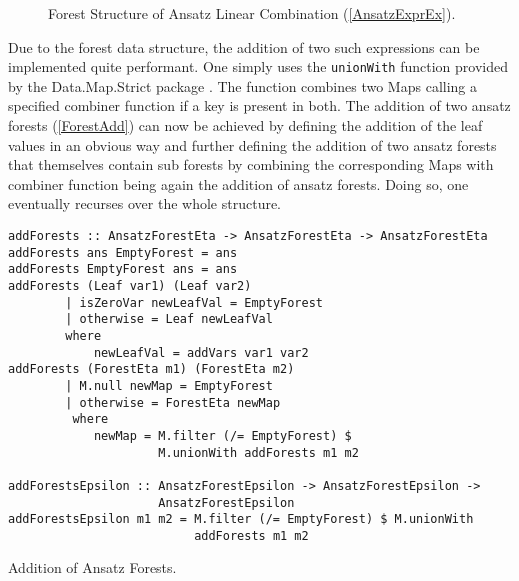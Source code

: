 \begin{figure}
\caption{Forest Structure of Ansatz Linear Combination (\ref{AnsatzExprEx}). }
\label{AnsatzExprExForest}
\end{figure}

Due to the forest data structure, the addition of two such expressions can be implemented quite performant. One simply uses the \texttt{unionWith} function provided by the Data.Map.Strict package \cite{HackageMap}. The function combines two Maps calling a specified combiner function if a key is present in both. The addition of two ansatz forests (\ref{ForestAdd}) can now be achieved by defining the addition of the leaf values in an obvious way and further defining the addition of two ansatz forests that themselves contain sub forests by combining the corresponding Maps with combiner function being again the addition of ansatz forests. Doing so, one eventually recurses over the whole structure. 
\begin{listing}[hbt!] 
\begin{verbatim}
addForests :: AnsatzForestEta -> AnsatzForestEta -> AnsatzForestEta
addForests ans EmptyForest = ans
addForests EmptyForest ans = ans
addForests (Leaf var1) (Leaf var2)
        | isZeroVar newLeafVal = EmptyForest
        | otherwise = Leaf newLeafVal
        where
            newLeafVal = addVars var1 var2
addForests (ForestEta m1) (ForestEta m2)
        | M.null newMap = EmptyForest
        | otherwise = ForestEta newMap
         where
            newMap = M.filter (/= EmptyForest) $
                     M.unionWith addForests m1 m2

addForestsEpsilon :: AnsatzForestEpsilon -> AnsatzForestEpsilon ->
                     AnsatzForestEpsilon
addForestsEpsilon m1 m2 = M.filter (/= EmptyForest) $ M.unionWith
                          addForests m1 m2
\end{verbatim} 
\caption{Addition of Ansatz Forests.}\label{ForestAdd}
\end{listing}\\

